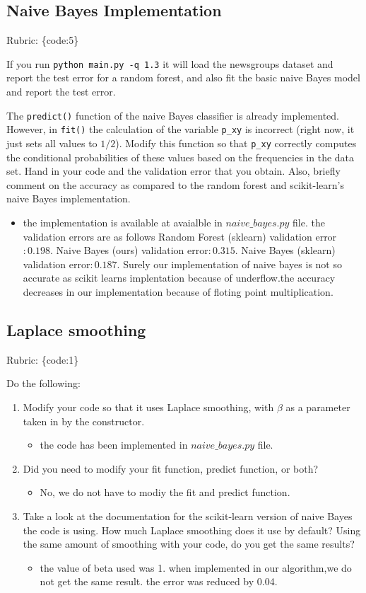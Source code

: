 \documentclass{article}
\def\blu#1{{\color{blu}#1}}
\def\gre#1{{\color{gre}#1}}
\def\items#1{\begin{itemize}#1\end{itemize}}
\def\enum#1{\begin{enumerate}#1\end{enumerate}}
\def\rubric#1{\gre{Rubric: \{#1\}}}{}
\begin{document}
\subsection{Naive Bayes Implementation}
\rubric{code:5}

If you run \texttt{python main.py -q 1.3}
it will load the newsgroups dataset and report the test error for a random forest,
and also fit the basic naive Bayes model and report the test error.

The \texttt{predict()} function of the naive Bayes classifier is already implemented.
However, in \texttt{fit()}
the calculation of the variable \texttt{p\_xy} is incorrect
(right now, it just sets all values to $1/2$).
\blu{Modify this function so that \texttt{p\_xy} correctly
computes the conditional probabilities of these values based on the
frequencies in the data set. Hand in your code and the validation error that you obtain.
Also, briefly comment on the accuracy as compared to the random forest and scikit-learn's naive Bayes implementation.}
\items{
\item the implementation is available at avaialble in $ naive\_bayes.py$  file. the validation errors are as follows
\newline Random Forest (sklearn) validation error $: 0.198$.
\newline Naive Bayes (ours) validation error$: 0.315$.
\newline Naive Bayes (sklearn) validation error$: 0.187$.
\newline Surely our implementation of naive bayes is not so accurate as scikit learns implentation because of underflow.the accuracy decreases in our implementation because of floting point multiplication.
}


\subsection{Laplace smoothing}
\rubric{code:1}

\blu{Do the following:}
\enum{
\item Modify your code so that it uses Laplace smoothing, with $\beta$
as a parameter taken in by the constructor.
\items {
\item the code has been implemented in $naive\_bayes.py$ file.
}
\item Did you need to modify your fit function, predict function, or both?
\items{
\item No, we do not have to modiy the fit and predict function.
}
\item Take a look at the documentation for the scikit-learn version of naive Bayes the code is using. How much Laplace smoothing does it use by default? Using the same amount of smoothing with your code, do you get the same results?
\items{
\item the value of beta used was 1. when implemented in our algorithm,we do not get the same result. the error was reduced by 0.04.
}
}
\end{document}
